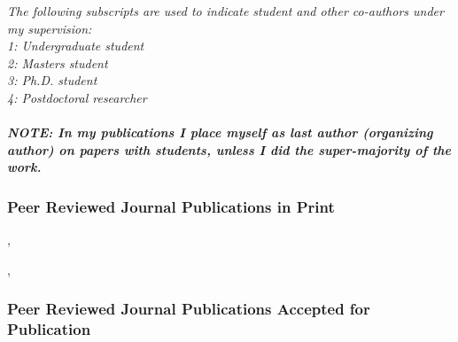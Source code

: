 

\emph{
  The following subscripts are used to indicate student and other co-authors
  under my supervision:\\
  1: Undergraduate student\\
  2:  Masters student\\
  3: Ph.D. student\\
  4: Postdoctoral researcher\\
  \\%
  \textbf{NOTE: In my publications I place myself as last author (organizing
    author) on
    papers with students, unless I did the super-majority of the work.}
}


\subsubsection{Peer Reviewed Journal Publications in Print}
\begin{revjournalbib}
\item {}, 
\item {}, 
\end{revjournalbib}

\subsubsection{Peer Reviewed Journal Publications Accepted for Publication}

